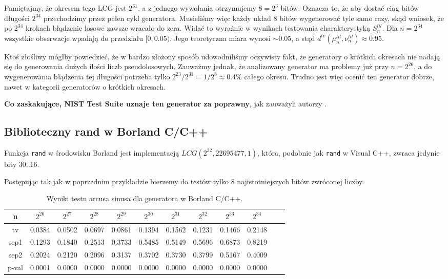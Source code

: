 \documentclass[a4paper,11pt,twoside]{book}
\newcommand{\Slil}[1]{S^{lil}_#1}
\theoremstyle{definition}
\begin{document}
Pamiętajmy, że okresem tego LCG jest $2^{31}$, a z jednego wywołania otrzymujemy $8 = 2^3$ bitów. Oznacza to, że aby dostać ciąg bitów długości $2^{34}$ przechodzimy przez pełen cykl generatora. Musieliśmy więc każdy układ 8 bitów wygenerować tyle samo razy, skąd wniosek, że po $2^{34}$ krokach błądzenie losowe zawsze wracało do zera. Widać to wyraźnie w wynikach testowania charakterystyką $\Slil{n}$. Dla $n=2^{34}$ wszystkie obserwacje wpadają do przedziału $[0, 0.05)$. Jego teoretyczna miara wynosi $\sim 0.05$, a stąd $d^{tv}(\mu^{lil}_n, \nu^{lil}_n) \approx 0.95$.

Ktoś złośliwy mógłby powiedzieć, że w bardzo złożony sposób udowodniliśmy oczywisty fakt, że generatory o krótkich okresach nie nadają się do generowania dużych ilości liczb pseudolosowych. Zauważmy jednak, że analizowany generator ma problemy już przy $n=2^{26}$, a do wygenerowania błądzenia tej długości potrzeba tylko $2^{23} / 2^{31} = 1/2^8 \approx 0.4\%$ całego okresu. Trudno jest więc ocenić ten generator dobrze, nawet w kategorii generatorów o krótkich okresach.

\textbf{Co zaskakujące, NIST Test Suite uznaje ten generator za poprawny}, jak zauważyli autorzy \cite{wang-nic}.

\FloatBarrier
\subsection{Biblioteczny rand w Borland C/C++}
Funkcja \texttt{rand} w środowisku Borland jest implementacją $LCG(2^{32}, 22695477, 1)$, która, podobnie jak \texttt{rand} w Visual C++, zwraca jedynie bity 30..16.

Postępując tak jak w poprzednim przykładzie bierzemy do testów tylko 8 najistotniejszych bitów zwróconej liczby.
\begin{table}[ht!]
\centering
 \caption{Wyniki testu arcusa sinusa dla generatora w Borland C/C++.}
 \label{tab:borland_asin}
\begin{tabular} {||c|c|c|c|c|c|c|c|c|c|c|c||}  
 \hline
     n &  $2^{26}$ &  $2^{27}$ &  $2^{28}$ &  $2^{29}$ &  $2^{30}$ &  $2^{31}$ &  $2^{32}$ &  $2^{33}$ &  $2^{34}$\\ \hline
     tv &  0.0384 &  0.0502 &  0.0697 &  0.0861 &  0.1394 &  0.1562 &  0.1231 &  0.1466 &  0.2148\\ \hline
   sep1 &  0.1293 &  0.1840 &  0.2513 &  0.3733 &  0.5485 &  0.5149 &  0.5696 &  0.6873 &  0.8219\\ \hline
   sep2 &  0.2024 &  0.2120 &  0.2096 &  0.3137 &  0.3702 &  0.3730 &  0.3799 &  0.5167 &  0.4009\\ \hline
  p-val &  0.0001 &  0.0000 &  0.0000 &  0.0000 &  0.0000 &  0.0000 &  0.0000 &  0.0000 &  0.0000\\ \hline
\end{tabular}  
\end{table}
\end{document}

